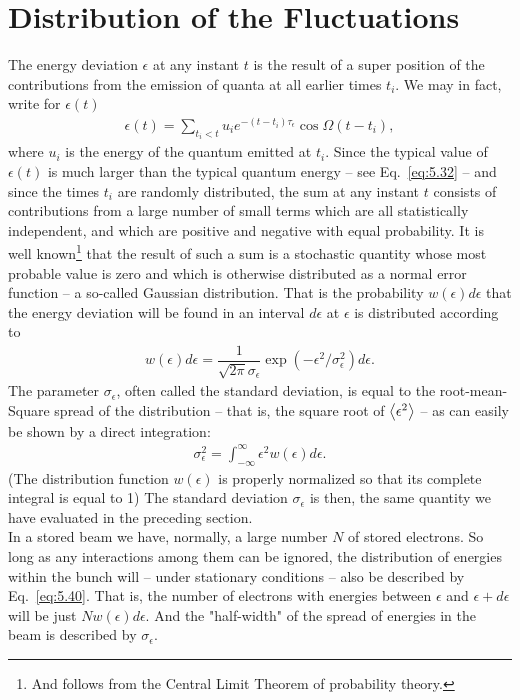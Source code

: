 \section{Distribution of the Fluctuations}\label{sec:5.3}

The energy deviation $\epsilon$ at any instant $t$ is the result of a super position of the
contributions from the emission of quanta at all earlier times $t_i$. We may in fact, write for $\epsilon(t)$
\begin{align} \label{eq:5.49}
	\epsilon(t) = \sum_{t_i<t} u_i e^{-(t-t_i)\tau_\epsilon}\cos\Omega(t-t_i),
\end{align}
where $u_i$ is the energy of the quantum emitted at $t_i$. Since the typical value of $\epsilon(t)$ is much larger than the typical quantum energy -- see Eq.~\eqref{eq:5.32} -- and since the times $t_i$ are randomly distributed, the sum at any instant $t$ consists of contributions from a large number of small terms which are all statistically independent, and which are positive and negative with equal probability. It is well known\footnote{And follows from the Central Limit Theorem of probability theory.} that the result of such a sum is a stochastic quantity whose most probable value is zero and which is otherwise distributed as a normal error function -- a so-called Gaussian distribution. That is the probability $w(\epsilon)d\epsilon$ that the energy deviation
will be found in an interval $d\epsilon$ at $\epsilon$ is distributed according to
\begin{align}\label{eq:5.50}
	w(\epsilon)d\epsilon = \dfrac{1}{\sqrt{2\pi}\sigma_\epsilon} \exp{(-\epsilon^2/\sigma_\epsilon^2)}d\epsilon.
\end{align}
The parameter $\sigma_\epsilon$, often called the standard deviation, is equal to the root-mean-
Square spread of the distribution -- that is, the square root of $\left< \epsilon^2 \right>$ -- as can
easily be shown by a direct integration:
\begin{align}
	\sigma_\epsilon^2 = \int_{-\infty}^{\infty} \epsilon^2 w(\epsilon) d\epsilon.
\end{align}
(The distribution function $w(\epsilon)$ is properly normalized so that its complete integral
is equal to 1) The standard deviation $\sigma_\epsilon$ is then, the same quantity we have evaluated in the preceding section.\\
In a stored beam we have, normally, a large number $N$ of stored electrons. So long as any interactions among them can be ignored, the distribution of energies within the bunch will -- under stationary conditions -- also be described by Eq.~\eqref{eq:5.40}. That is, the number of electrons with energies between $\epsilon$ and $\epsilon+d\epsilon$ will be just $Nw(\epsilon)d\epsilon$. And the "half-width" of the spread of energies in the beam is described by $\sigma_\epsilon$.\\
